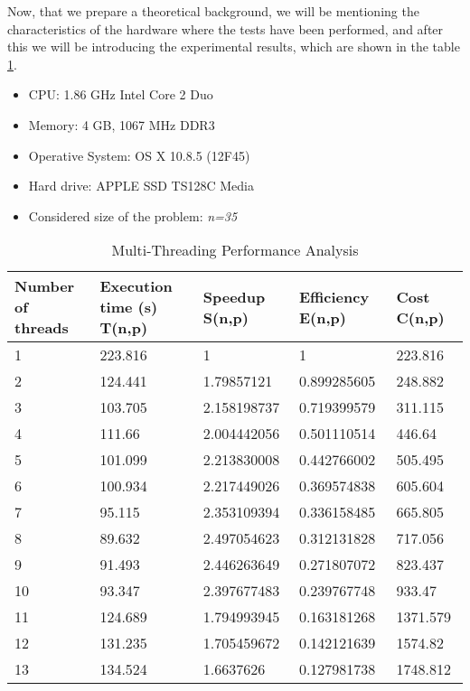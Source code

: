 Now, that we prepare a theoretical background, we will be mentioning the characteristics of the hardware where the tests have been performed, and after this we will be introducing the experimental results, which are shown in the table \ref{tab:threadsTime}.

\begin{itemize}
	\item CPU: 1.86 GHz Intel Core 2 Duo
	\item Memory:  4 GB, 1067 MHz DDR3
	\item Operative System: OS X 10.8.5 (12F45)
	\item Hard drive: APPLE SSD TS128C Media
	\item Considered size of the problem: \emph{n=35}
\end{itemize}

\begin{table}\centering
	\caption{Multi-Threading Performance Analysis}\label{tab:threadsTime}
   	\begin{tabular}{ | p{2.5cm\textwidth} | p{2.5cm\textwidth} | p{2.5cm\textwidth} | p{2.5cm\textwidth} | p{2.5cm\textwidth} |}
   	\hline
\textbf{Number of threads} & \textbf{Execution time (s) T(n,p)}& \textbf{Speedup S(n,p)} & \textbf{Efficiency E(n,p)} & \textbf{Cost C(n,p)} \\\hline
1               & 223.816 	&	 1			&	1			&	223.816          \\\hline
2               & 124.441	&	 1.79857121	&	0.899285605	&	248.882           \\\hline
3               & 103.705	&	 2.158198737 	&	0.719399579	&	311.115           \\\hline
4               & 111.66	&	 2.004442056	&	0.501110514	&	446.64            \\\hline
5               & 101.099	&	 2.213830008	&	0.442766002	&	505.495           \\\hline
6               & 100.934	&	 2.217449026	&	0.369574838	&	605.604           \\\hline
7               & 95.115	&	 2.353109394 	&	0.336158485	&	665.805            \\\hline
8               & 89.632	&	 2.497054623	&	0.312131828	&	717.056            \\\hline
9               & 91.493	&	 2.446263649	&	0.271807072	&	823.437            \\\hline
10              & 93.347	&	 2.397677483	&	0.239767748	&	933.47            \\\hline
11              & 124.689	&	 1.794993945	&	0.163181268	&	1371.579           \\\hline
12              & 131.235	&	 1.705459672	&	0.142121639	&	1574.82           \\\hline
13              & 134.524	&	 1.6637626	&	0.127981738	&    1748.812      \\\hline

    \end{tabular}
\end{table}

